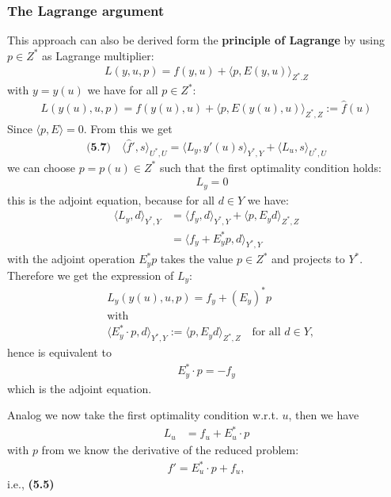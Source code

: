 \documentclass[a4paper,11pt,fleqn]{book}
\theoremstyle{definition}
\theoremstyle{remark}
\begin{document}
\subsubsection*{The Lagrange argument}
	This approach can also be derived form the \textbf{principle of Lagrange }by using $p \in Z^*$ as Lagrange multiplier:  
	\begin{align*}
		L(y, u, p)= f(y, u) + \langle p, E(y, u) \rangle_{Z^*. Z}
	\end{align*} 
	with $y = y(u)$ we have for all $ p \in Z^*$:
	\begin{align*}
		L(y(u), u, p) = f(y(u), u) + \langle p, E(y(u), u) \rangle_{Z^*, Z} := \hat{f}(u)
	\end{align*}
	Since $\langle p, E \rangle = 0$.  From this we get 
	\begin{align*}\textbf{(5.7)}\quad 
		\langle \hat{f}', s \rangle_{U^*, U} = \langle L_y, y'(u)s\rangle_{Y^*, Y} + \langle L_u, s \rangle_{U^*, U}
	\end{align*}
	we can choose $p= p(u) \in Z^*$ such that the first optimality condition holds:  
	\begin{align*} \quad
		L_y = 0
	\end{align*}
	this is the adjoint equation, because for all $d \in Y$ we have:
	\begin{align*}
		\langle L_y, d \rangle_{Y^*, Y} &= \langle f_y, d \rangle_{Y^*, Y} + \langle p, E_y d \rangle_{Z^*, Z }\\
		&= \langle f_y + E_y^* p , d \rangle_{Y^*, Y}
	\end{align*}
	with the adjoint operation $E_y^* p$ takes the value $p \in Z^*$ and projects to $Y^*$. Therefore we get the expression of $L_y$:
	\begin{align*}
		& L_y(y(u), u, p) = f_y + (E_y)^* p \\
		& \text{with} \\
		&  \langle E_y^* \cdot p, d \rangle_{Y^*, Y}  := \langle p, E_y d  \rangle_{Z^*, Z} \quad \text{for all } d \in Y,
	\end{align*}
	hence  is equivalent to 
	\begin{align*}
		E_y^* \cdot  p = - f_y
	\end{align*}
	which is the adjoint equation.\par 
	Analog we now take the first optimality condition w.r.t. $u$, then we have 
	\begin{align*}
		L_u &= f_u + E_u^* \cdot  p 
	\end{align*}
	with $p$ from  we know the derivative of the reduced problem: 
	\begin{align*}
		\hat{f}' = E_u^* \cdot  p + f_u,
	\end{align*}
	i.e., \textbf{(5.5)}
\end{document}
